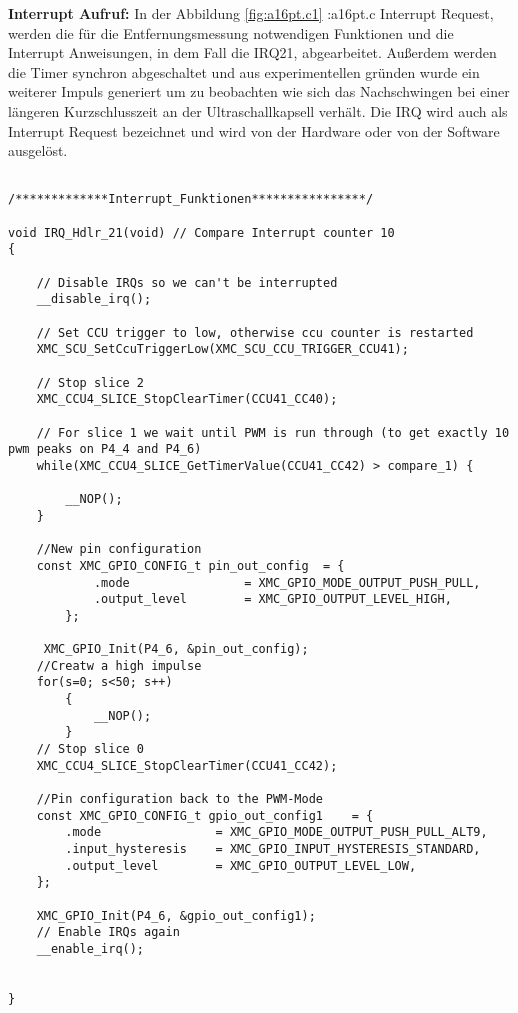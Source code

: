 \textbf{Interrupt Aufruf:}
In der Abbildung \ref{fig:a16pt.c1} :a16pt.c Interrupt Request, werden die für die Entfernungsmessung notwendigen Funktionen und die Interrupt Anweisungen, in dem Fall die IRQ21, abgearbeitet. Außerdem werden die Timer synchron abgeschaltet und aus experimentellen gründen wurde ein weiterer Impuls generiert um zu beobachten wie sich das Nachschwingen bei einer längeren Kurzschlusszeit an der Ultraschallkapsell verhält. Die IRQ wird auch als Interrupt Request bezeichnet und wird von der Hardware oder von der Software ausgelöst.
\\
\begin{minipage}{1\textwidth}
\begin{lstlisting}

/*************Interrupt_Funktionen****************/

void IRQ_Hdlr_21(void) // Compare Interrupt counter 10
{

	// Disable IRQs so we can't be interrupted
	__disable_irq();

	// Set CCU trigger to low, otherwise ccu counter is restarted
	XMC_SCU_SetCcuTriggerLow(XMC_SCU_CCU_TRIGGER_CCU41);

	// Stop slice 2
	XMC_CCU4_SLICE_StopClearTimer(CCU41_CC40);

	// For slice 1 we wait until PWM is run through (to get exactly 10 pwm peaks on P4_4 and P4_6)
	while(XMC_CCU4_SLICE_GetTimerValue(CCU41_CC42) > compare_1) {

		__NOP();
	}
	
	//New pin configuration
	const XMC_GPIO_CONFIG_t pin_out_config	= {
			.mode                = XMC_GPIO_MODE_OUTPUT_PUSH_PULL,
			.output_level        = XMC_GPIO_OUTPUT_LEVEL_HIGH,
		};

	 XMC_GPIO_Init(P4_6, &pin_out_config);
	//Creatw a high impulse
	for(s=0; s<50; s++)
		{
			__NOP();
		}
	// Stop slice 0
	XMC_CCU4_SLICE_StopClearTimer(CCU41_CC42);
	
	//Pin configuration back to the PWM-Mode
	const XMC_GPIO_CONFIG_t gpio_out_config1	= {
		.mode                = XMC_GPIO_MODE_OUTPUT_PUSH_PULL_ALT9,
		.input_hysteresis    = XMC_GPIO_INPUT_HYSTERESIS_STANDARD,
		.output_level        = XMC_GPIO_OUTPUT_LEVEL_LOW,
	};

	XMC_GPIO_Init(P4_6, &gpio_out_config1);
	// Enable IRQs again
	__enable_irq();


}
\end{lstlisting}
\label{fig:a16pt.c1}
\end{minipage}

